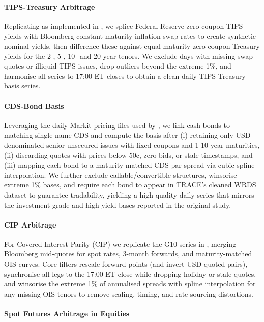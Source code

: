 \documentclass{article}
\begin{document}
\paragraph{TIPS-Treasury Arbitrage}
Replicating \citet{Fleckenstein2014} as implemented in \citet{Siriwardane2021}, we splice Federal Reserve zero-coupon TIPS yields with Bloomberg constant-maturity inflation-swap rates to create synthetic nominal yields, then difference these against equal-maturity zero-coupon Treasury yields for the 2-, 5-, 10- and 20-year tenors.  We exclude days with missing swap quotes or illiquid TIPS issues, drop outliers beyond the extreme 1\%, and harmonise all series to 17:00 ET closes to obtain a clean daily TIPS-Treasury basis series.

\paragraph{CDS-Bond Basis}
Leveraging the daily Markit pricing files used by \citet{Siriwardane2021}, we link cash bonds to matching single-name CDS and compute the basis after (i) retaining only USD-denominated senior unsecured issues with fixed coupons and 1-10-year maturities, (ii) discarding quotes with prices below 50¢, zero bids, or stale timestamps, and (iii) mapping each bond to a maturity-matched CDS par spread via cubic-spline interpolation.  We further exclude callable/convertible structures, winsorise extreme 1\% bases, and require each bond to appear in TRACE's cleaned WRDS dataset to guarantee tradability, yielding a high-quality daily series that mirrors the investment-grade and high-yield bases reported in the original study.

\paragraph{CIP Arbitrage}
For Covered Interest Parity (CIP) we replicate the G10 series in \citet{Du2018}, merging Bloomberg mid-quotes for spot rates, 3-month forwards, and maturity-matched OIS curves.  Core filters rescale forward points (and invert USD-quoted pairs), synchronise all legs to the 17:00 ET close while dropping holiday or stale quotes, and winsorise the extreme 1\% of annualised spreads with spline interpolation for any missing OIS tenors to remove scaling, timing, and rate-sourcing distortions.

\paragraph{Spot Futures Arbitrage in Equities}
\end{document}
